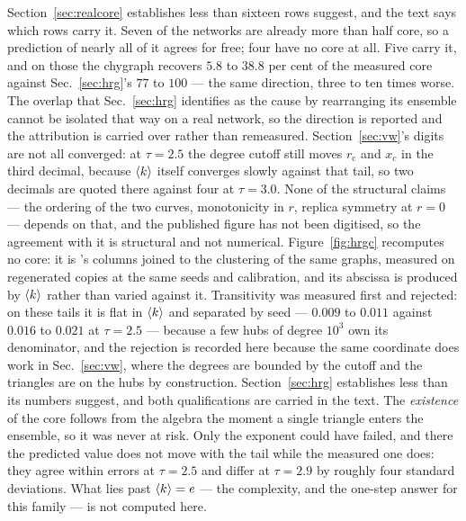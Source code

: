 Section~\ref{sec:realcore} establishes less than sixteen rows suggest, and the
text says which rows carry it. Seven of the networks are already more than half
core, so a prediction of nearly all of it agrees for free; four have no core at
all. Five carry it, and on those the chygraph recovers $5.8$ to $38.8$ per cent
of the measured core against Sec.~\ref{sec:hrg}'s $77$ to $100$ --- the same
direction, three to ten times worse. The overlap that
Sec.~\ref{sec:hrg} identifies as the cause by rearranging its ensemble cannot
be isolated that way on a real network, so the direction is reported and the
attribution is carried over rather than remeasured.
Section~\ref{sec:vw}'s digits are not all converged: at $\tau=2.5$ the
degree cutoff still moves $r_{\mathrm{c}}$ and $x_{c}$ in the third decimal,
because $\langle k \rangle$ itself converges slowly against that tail, so two decimals
are quoted there against four at $\tau=3.0$. None of the structural claims ---
the ordering of the two curves, monotonicity in $r$, replica symmetry at $r=0$
--- depends on that, and the published figure has not been digitised, so the
agreement with it is structural and not numerical.
Figure~\ref{fig:hrgc} recomputes no core: it is
's columns joined to the clustering of the same graphs,
measured on regenerated copies at the same seeds and calibration, and its
abscissa is produced by $\langle k \rangle$ rather than varied against it. Transitivity
was measured first and rejected: on these tails it is flat in $\langle k \rangle$ and
separated by seed --- $0.009$ to $0.011$ against $0.016$ to $0.021$ at
$\tau=2.5$ --- because a few hubs of degree $10^{3}$ own its denominator, and
the rejection is recorded here because the same coordinate does work in
Sec.~\ref{sec:vw}, where the degrees are bounded by the cutoff and the
triangles are on the hubs by construction.
Section~\ref{sec:hrg} establishes less than its numbers suggest, and both
qualifications are carried in the text. The
\emph{existence} of the core follows from the algebra the moment a single
triangle enters the ensemble, so it was never at risk. Only the exponent could
have failed, and there the predicted value does not move with the tail while the
measured one does: they agree within errors at $\tau=2.5$ and differ at
$\tau=2.9$ by roughly four standard deviations. What lies past $\langle k \rangle=e$ --- the
complexity, and the one-step answer for this family --- is not computed here.
